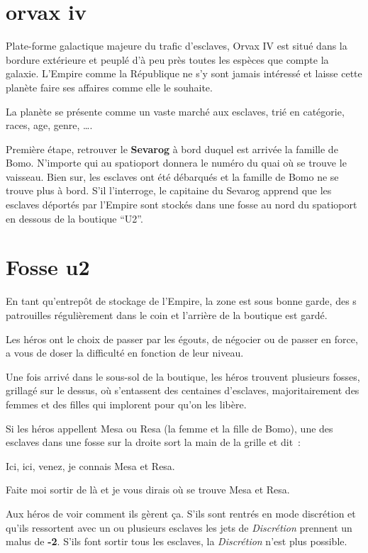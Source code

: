 \documentclass{jdrp}
\begin{document}
	\section{orvax iv}
	Plate-forme galactique majeure du trafic d’esclaves, Orvax IV est situé dans la bordure extérieure et peuplé d’à peu près toutes les espèces que compte la galaxie. L’Empire comme la République ne s’y sont jamais intéressé et laisse cette planète faire ses affaires comme elle le souhaite.

	La planète se présente comme un vaste marché aux esclaves, trié en catégorie, races, age, genre, \ldots.

	Première étape, retrouver le \textbf{Sevarog} à bord duquel est arrivée la famille de Bomo. N’importe qui au spatioport donnera le numéro du quai où se trouve le vaisseau. Bien sur, les esclaves ont été débarqués et la famille de Bomo ne se trouve plus à bord. S’il l'interroge, le capitaine du Sevarog apprend que les esclaves déportés par l’Empire sont stockés dans une fosse au nord du spatioport en dessous de la boutique “U2”.

	\section{Fosse u2}
	En tant qu’entrepôt de stockage de l’Empire, la zone est sous bonne garde, des s patrouilles régulièrement dans le coin et l’arrière de la boutique est gardé.

	Les héros ont le choix de passer par les égouts, de négocier ou de passer en force, a vous de doser la difficulté en fonction de leur niveau.

	Une fois arrivé dans le sous-sol de la boutique, les héros trouvent plusieurs fosses, grillagé sur le dessus, où s’entassent des centaines d’esclaves, majoritairement des femmes et des filles qui implorent pour qu’on les libère.

	Si les héros appellent Mesa ou Resa (la femme et la fille de Bomo), une des esclaves dans une fosse sur la droite sort la main de la grille et dit~:

	\begin{quotebox}
    	Ici, ici, venez, je connais Mesa et Resa.

    	Faite moi sortir de là et je vous dirais où se trouve Mesa et Resa.
	\end{quotebox}
	Aux héros de voir comment ils gèrent ça. S’ils sont rentrés en mode discrétion et qu’ils ressortent avec un ou plusieurs esclaves les jets de \textit{Discrétion} prennent un malus de \textbf{-2}. S’ils font sortir tous les esclaves, la \textit{Discrétion} n’est plus possible.
\end{document}

